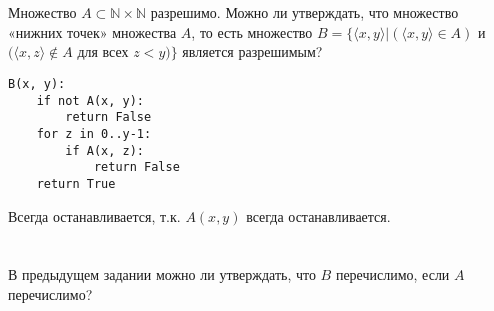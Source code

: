 \section{}
Множество $A \subset \mathbb{N} \times \mathbb{N}$ разрешимо. Можно ли утверждать, что множество «нижних точек» множества $A$, то есть множество $B = \{\langle x,y\rangle | (\langle x,y\rangle \in A)$ и $(\langle x,z\rangle \not\in A$ для всех $z < y)\}$ является разрешимым?

\begin{verbatim}
B(x, y):
    if not A(x, y):
        return False
    for z in 0..y-1:
        if A(x, z):
            return False
    return True
\end{verbatim}

Всегда останавливается, т.к. \(A(x, y)\) всегда останавливается.

\section{}
В предыдущем задании можно ли утверждать, что $B$ перечислимо, если $A$ перечислимо?



